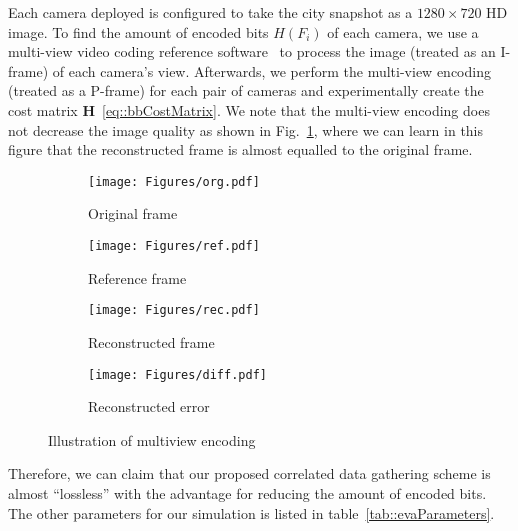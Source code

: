 Each camera deployed is configured to take the city snapshot as a $1280 \times 720$ HD image.
To find the amount of encoded bits $H(F_i)$ of each camera, we use a multi-view video coding reference software~\cite{JMVC} to process the image (treated as an I-frame) of each camera's view.
Afterwards, we perform the multi-view encoding (treated as a P-frame) for each pair of cameras and experimentally create the cost matrix $\mathbf{H}$~\eqref{eq::bbCostMatrix}.
We note that the multi-view encoding does not decrease the image quality as shown in Fig.~\ref{fig::multiViewImageDemo}, where we can learn in this figure that the reconstructed frame is almost equalled to the original frame.
%
\begin{figure}
\begin{center}
\begin{subfigure}[b]{0.45\columnwidth}
\texttt{[image: Figures/org.pdf]}
\caption{Original frame}
\end{subfigure}
\begin{subfigure}[b]{0.45\columnwidth}
\texttt{[image: Figures/ref.pdf]}
\caption{Reference frame}
\end{subfigure}
\begin{subfigure}[b]{0.45\columnwidth}
\texttt{[image: Figures/rec.pdf]}
\caption{Reconstructed frame}
\end{subfigure}
\begin{subfigure}[b]{0.45\columnwidth}
\texttt{[image: Figures/diff.pdf]}
\caption{Reconstructed error}
\end{subfigure}
\caption{\label{fig::multiViewImageDemo} Illustration of multiview encoding}
\end{center}
\end{figure}
%
Therefore, we can claim that our proposed correlated data gathering scheme is almost ``lossless'' with the advantage for reducing the amount of encoded bits.
The other parameters for our simulation is listed in table~\ref{tab::evaParameters}.
%
%
